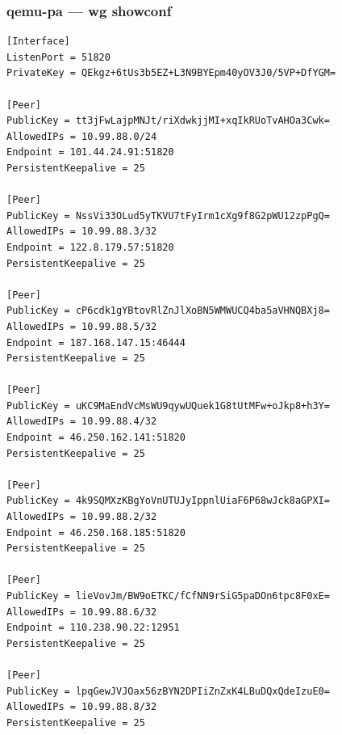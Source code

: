 \documentclass[11pt,a4paper]{article}
\begin{document}
\subsubsection*{qemu-pa — wg showconf}
\begin{lstlisting}
[Interface]
ListenPort = 51820
PrivateKey = QEkgz+6tUs3b5EZ+L3N9BYEpm40yOV3J0/5VP+DfYGM=

[Peer]
PublicKey = tt3jFwLajpMNJt/riXdwkjjMI+xqIkRUoTvAHOa3Cwk=
AllowedIPs = 10.99.88.0/24
Endpoint = 101.44.24.91:51820
PersistentKeepalive = 25

[Peer]
PublicKey = NssVi33OLud5yTKVU7tFyIrm1cXg9f8G2pWU12zpPgQ=
AllowedIPs = 10.99.88.3/32
Endpoint = 122.8.179.57:51820
PersistentKeepalive = 25

[Peer]
PublicKey = cP6cdk1gYBtovRlZnJlXoBN5WMWUCQ4ba5aVHNQBXj8=
AllowedIPs = 10.99.88.5/32
Endpoint = 187.168.147.15:46444
PersistentKeepalive = 25

[Peer]
PublicKey = uKC9MaEndVcMsWU9qywUQuek1G8tUtMFw+oJkp8+h3Y=
AllowedIPs = 10.99.88.4/32
Endpoint = 46.250.162.141:51820
PersistentKeepalive = 25

[Peer]
PublicKey = 4k9SQMXzKBgYoVnUTUJyIppnlUiaF6P68wJck8aGPXI=
AllowedIPs = 10.99.88.2/32
Endpoint = 46.250.168.185:51820
PersistentKeepalive = 25

[Peer]
PublicKey = lieVovJm/BW9oETKC/fCfNN9rSiG5paDOn6tpc8F0xE=
AllowedIPs = 10.99.88.6/32
Endpoint = 110.238.90.22:12951
PersistentKeepalive = 25

[Peer]
PublicKey = lpqGewJVJOax56zBYN2DPIiZnZxK4LBuDQxQdeIzuE0=
AllowedIPs = 10.99.88.8/32
PersistentKeepalive = 25

\end{lstlisting}
\end{document}

